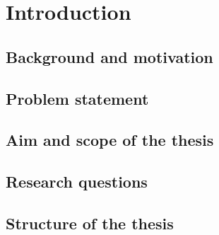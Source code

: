\chapter{Introduction}

\section{Background and motivation}

\section{Problem statement}

\section{Aim and scope of the thesis}

\section{Research questions}

\section{Structure of the thesis}
